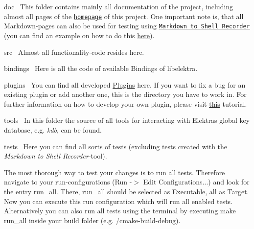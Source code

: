\begin{DoxyItemize}
\item doc~\newline
 This folder contains mainly all documentation of the project, including almost all pages of the \href{https://www.libelektra.org}{\tt homepage} of this project. One important note is, that all Markdown-\/pages can also be used for testing using \href{https://github.com/ElektraInitiative/libelektra/tree/master/tests/shell/shell_recorder/tutorial_wrapper}{\tt Markdown to Shell Recorder} (you can find an example on how to do this \hyperlink{doc_help_kdb-get_md}{here}).
\item src~\newline
 Almost all functionality-\/code resides here.
\begin{DoxyItemize}
\item bindings~\newline
 Here is all the code of available Bindings of libelektra.
\item plugins~\newline
 You can find all developed \hyperlink{src_plugins_README_md}{Plugins} here. If you want to fix a bug for an existing plugin or add another one, this is the directory you have to work in. For further information on how to develop your own plugin, please visit \hyperlink{doc_tutorials_plugins_md}{this} tutorial.
\item tools~\newline
 In this folder the source of all tools for interacting with Elektra\textquotesingle{}s global key database, e.\+g. {\itshape kdb}, can be found.
\end{DoxyItemize}
\item tests~\newline
 Here you can find all sorts of tests (excluding tests created with the {\itshape Markdown to Shell Recorder}-\/tool).
\end{DoxyItemize}

The most thorough way to test your changes is to run all tests. Therefore navigate to your run-\/configurations (Run -\/$>$ Edit Configurations...) and look for the entry {\ttfamily run\+\_\+all}. There, {\ttfamily run\+\_\+all} should be selected as {\ttfamily Executable}, {\ttfamily all} as {\ttfamily Target}. Now you can execute this run configuration which will run all enabled tests. Alternatively you can also run all tests using the terminal by executing {\ttfamily make run\+\_\+all} inside your build folder (e.\+g. /cmake-\/build-\/debug).


